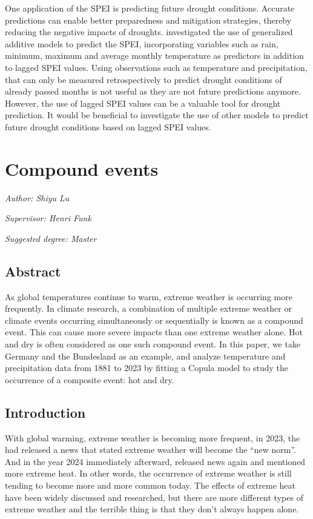 \documentclass[
]{krantz}
\begin{document}
One application of the SPEI is predicting future drought conditions. Accurate predictions can enable better preparedness and mitigation strategies, thereby reducing the negative impacts of droughts. \citet{mathivha2020} investigated the use of generalized additive models to predict the SPEI, incorporating variables such as rain, minimum, maximum and average monthly temperature as predictors in addition to lagged SPEI values.
Using observations such as temperature and precipitation, that can only be measured retrospectively to predict drought conditions of already passed months is not useful as they are not future predictions anymore. However, the use of lagged SPEI values can be a valuable tool for drought prediction.
It would be beneficial to investigate the use of other models to predict future drought conditions based on lagged SPEI values.

\chapter{Compound events}\label{ce}

\emph{Author: Shiyu Lu}

\emph{Supervisor: Henri Funk}

\emph{Suggested degree: Master}

\section{Abstract}\label{abstract-1}

As global temperatures continue to warm, extreme weather is occurring more frequently. In climate research, a combination of multiple extreme weather or climate events occurring simultaneously or sequentially is known as a compound event. This can cause more severe impacts than one extreme weather alone. Hot and dry is often considered as one such compound event. In this paper, we take Germany and the Bundesland as an example, and analyze temperature and precipitation data from 1881 to 2023 by fitting a Copula model to study the occurrence of a composite event: hot and dry.

\section{Introduction}\label{introduction-2}

With global warming, extreme weather is becoming more frequent, in 2023, the \citet{wmo2023a} had released a news that stated extreme weather will become the ``new norm''. And in the year 2024 immediately afterward, \citet{wmo2024} released news again and mentioned more extreme heat. In other words, the occurrence of extreme weather is still tending to become more and more common today. The effects of extreme heat have been widely discussed and researched, but there are more different types of extreme weather and the terrible thing is that they don't always happen alone.
\end{document}
